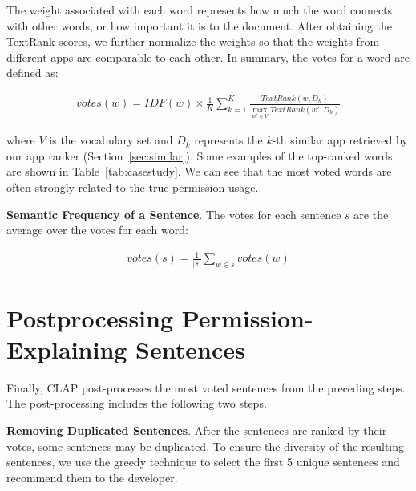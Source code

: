 The weight associated with each word represents how much the word connects with other words, or how important it is to the document. 
After obtaining the TextRank scores, we further normalize the weights so that the weights from different apps are comparable to each other. 
In summary, the votes for a word are defined as:

\begin{eqnarray}
votes(w) = IDF(w) \times \frac{1}{K}\sum_{k=1}^K \frac{TextRank(w, D_k)}{\underset{w'\in V}\max TextRank(w', D_k)}\label{eq:vote}
\end{eqnarray}

\noindent where $V$ is the vocabulary set and $D_k$ represents the $k$-th similar app retrieved by our app ranker (Section~\ref{sec:similar}). 
Some examples of the top-ranked words are shown in Table~\ref{tab:casestudy}. 
We can see that the most voted words are often strongly related to the true permission usage. 

\textbf{Semantic Frequency of a Sentence}. 
The votes for each sentence $s$ are the average over the votes for each word:

\vspace{-0.3in}
\begin{eqnarray*}
votes(s) = \frac{1}{|s|}\sum_{w\in s} votes(w)
\end{eqnarray*}
\vspace{-0.4in}

\section{Postprocessing Permission-Explaining Sentences}
\label{sec:postprocess}

Finally, CLAP post-processes the most voted sentences from the preceding steps. 
The post-processing includes the following two steps.

\textbf{Removing Duplicated Sentences}. After the sentences are ranked by their votes, some sentences may be duplicated. 
To ensure the diversity of the resulting sentences, we use the greedy technique to select the first 5 unique sentences and recommend them to the developer.

